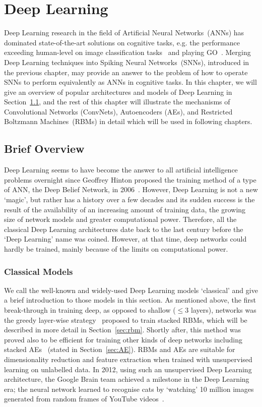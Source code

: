 \chapter{Deep Learning}
\label{cha:dnn}
Deep Learning research in the field of Artificial Neural Networks~(ANNs) has dominated state-of-the-art solutions on cognitive tasks, e.g. the performance exceeding human-level  on image classification tasks~\citep{he2015delving} and playing GO~\citep{silver2016mastering}.
Merging Deep Learning techniques into Spiking Neural Networks~(SNNs), introduced in the previous chapter, may provide an answer to the problem of how to operate SNNs to perform equivalently as ANNs in cognitive tasks. 
In this chapter, we will give an overview of popular architectures and models of Deep Learning in Section~\ref{sec:dl_history}, and the rest of this chapter will illustrate the mechanisms of Convolutional Networks (ConvNets), Autoencoders (AEs), and Restricted Boltzmann Machines~(RBMs) in detail which will be used in following chapters.

\section{Brief Overview}
\label{sec:dl_history}
Deep Learning seems to have become the answer to all artificial intelligence problems overnight since Geoffrey Hinton proposed the training method of a type of ANN, the Deep Belief Network, in 2006~\citep{hinton2006fast}.
However, Deep Learning is not a new `magic', but rather has a history over a few decades and its sudden success is the result of the availability of an increasing amount of training data, the growing size of network models and greater computational power.
Therefore, all the classical Deep Learning architectures date back to the last century before the `Deep Learning' name was coined.
However, at that time, deep networks could hardly be trained, mainly because of the limits on computational power.


\subsection{Classical Models}
We call the well-known and widely-used Deep Learning models `classical' and give a brief introduction to those models in this section. 
As mentioned above, the first break-through in training deep, as opposed to shallow ($\le 3$ layers), networks was the greedy layer-wise strategy~\citep{hinton2006fast} proposed to train stacked RBMs, which will be described in more detail in Section~\ref{sec:rbm}.
Shortly after, this method was proved also to be efficient for training other kinds of deep networks including stacked AEs~\citep{bengio2007greedy} (stated in Section~\ref{sec:AE}).
RBMs and AEs are suitable for dimensionality reduction and feature extraction when trained with unsupervised learning on unlabelled data.
In 2012, using such an unsupervised Deep Learning architecture, the Google Brain team achieved a milestone in the Deep Learning era; the neural network learned to recognise cats by `watching' 10 million images generated from random frames of YouTube videos~\citep{le2013building}.

